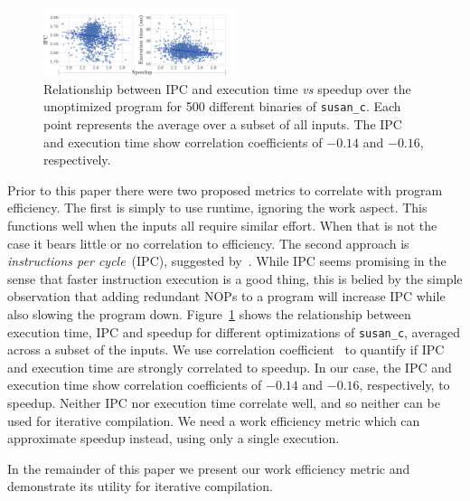     \begin{figure}[t]
        \centering
        \includegraphics[width=0.5\textwidth]{figs/motivation-metric.pdf}
        \caption{
            Relationship between IPC and execution time \textit{vs} speedup over the unoptimized program
            for 500 different binaries of \texttt{susan\_c}.
            Each point represents the average over a subset of all inputs.
            The IPC and execution time show correlation coefficients of $-0.14$ and $-0.16$, respectively.
        }
        \label{fig:motivation-metric}
    \end{figure}

    Prior to this paper there were two proposed metrics to correlate with program efficiency. The first is simply to use runtime, ignoring
    the work aspect. This functions well when the inputs all require similar effort. When that is not the case it bears little or no
    correlation to efficiency. The second approach is \textit{instructions per cycle}~(IPC), suggested by~\citep{fursin07}. While IPC seems
    promising in the sense that faster instruction execution is a good thing, this is belied by the simple observation that adding
    redundant NOPs to a program will increase IPC while also slowing the program down. Figure~\ref{fig:motivation-metric} shows the
    relationship between execution time, IPC and speedup for different optimizations of \texttt{susan\_c}, averaged across a subset of the
    inputs. We use correlation coefficient~\cite{Bishop:2006:PRM:1162264} to quantify if  IPC and execution time are strongly correlated to
    speedup.
    In our case, the IPC and execution time show correlation coefficients of $-0.14$ and $-0.16$,
    respectively, to speedup.
    Neither IPC nor execution time correlate well, and so neither can be used for iterative compilation. We need a work efficiency
    metric which can approximate speedup instead, using only a single execution.

    In the remainder of this paper we present our work efficiency metric and demonstrate its utility for iterative compilation.
